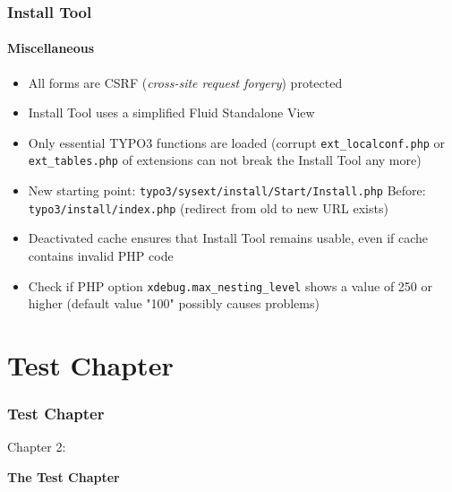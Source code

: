 \begin{frame}[fragile]
	\frametitle{Install Tool}
	\framesubtitle{Miscellaneous}

	\begin{itemize}
		\item All forms are CSRF (\textit{cross-site request forgery}) protected
		\item Install Tool uses a simplified Fluid Standalone View
		\item Only essential TYPO3 functions are loaded\newline
			(corrupt \texttt{ext\_localconf.php} or \texttt{ext\_tables.php} of extensions can not break the Install Tool any more)
		\item New starting point:	\tabto{3.2cm} \texttt{typo3/sysext/install/Start/Install.php}\newline
			Before:			\tabto{3.2cm} \texttt{typo3/install/index.php}\newline
			(redirect from old to new URL exists)
		\item Deactivated cache ensures that Install Tool remains usable, even if cache contains invalid PHP code
		\item Check if PHP option \texttt{xdebug.max\_nesting\_level} shows a value of 250 or higher (default value "100" possibly causes problems)
	\end{itemize}

\end{frame}


\section{Test Chapter}
\begin{frame}[fragile]
	\frametitle{Test Chapter}

	\begin{center}\huge{Chapter 2:}\end{center}
	\begin{center}\huge{\color{typo3darkgrey}\textbf{The Test Chapter}}\end{center}

\end{frame}


